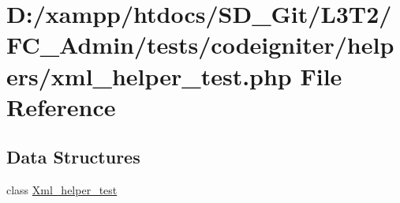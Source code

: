 \hypertarget{_admin_2tests_2codeigniter_2helpers_2xml__helper__test_8php}{}\section{D\+:/xampp/htdocs/\+S\+D\+\_\+\+Git/\+L3\+T2/\+F\+C\+\_\+\+Admin/tests/codeigniter/helpers/xml\+\_\+helper\+\_\+test.php File Reference}
\label{_admin_2tests_2codeigniter_2helpers_2xml__helper__test_8php}
\subsection*{Data Structures}
\begin{DoxyCompactItemize}
\item 
class \hyperlink{class_xml__helper__test}{Xml\+\_\+helper\+\_\+test}
\end{DoxyCompactItemize}
